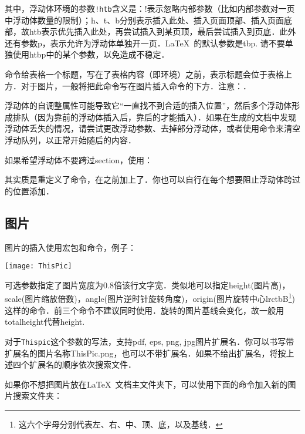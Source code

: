 其中，浮动体环境的参数\verb|!htb|含义是：!表示忽略内部参数（比如内部参数对一页中浮动体数量的限制）；h、t、b分别表示插入此处、插入页面顶部、插入页面底部，故htb表示优先插入此处，再尝试插入到某页顶，最后尝试插入到页底．此外还有参数p，表示允许为浮动体单独开一页．\LaTeX\ 的默认参数是tbp. 请不要单独使用htbp中的某个参数，以免造成不稳定．

命令给表格一个标题，写在了表格内容（即环境）之前，表示标题会位于表格上方．对于图片，一般将把此命令写在图片插入命令的下方．注意：．\dpar

浮动体的自调整属性可能导致它“一直找不到合适的插入位置”，然后多个浮动体形成排队（因为靠前的浮动体插入后，靠后的才能插入）．如果在生成的文档中发现浮动体丢失的情况，请尝试更改浮动参数、去掉部分浮动体，或者使用命令来清空浮动队列，以正常开始随后的内容．

如果希望浮动体不要跨过section，使用：
\begin{latex}
\usepackage[section]{placeins}
\end{latex}

其实质是重定义了命令，在之前加上了．你也可以自行在每个想要阻止浮动体跨过的位置添加．

\subsection{图片}
图片的插入使用宏包和命令，例子：
\begin{latex}
\begin{center}
    \texttt{[image: ThisPic]}
\end{center}
\end{latex}

可选参数指定了图片宽度为0.8倍该行文字宽．类似地可以指定height(图片高)，scale(图片缩放倍数)，angle(图片逆时针旋转角度)，origin(图片旋转中心lrctbB\footnote{这六个字母分别代表左、右、中、顶、底，以及基线．})这样的命令．前三个命令不建议同时使用．旋转的图片基线会变化，故一般用totalheight代替height. 

对于\texttt{Thispic}这个参数的写法，\xelatex 支持pdf, eps, png, jpg图片扩展名．你可以书写带扩展名的图片名称ThisPic.png，也可以不带扩展名．如果不给出扩展名，将按上述四个扩展名的顺序依次搜索文件．\dpar

如果你不想把图片放在\LaTeX\ 文档主文件夹下，可以使用下面的命令加入新的图片搜索文件夹：
\begin{latex}
\graphicspath{{c:/pics/}{./pic/}}
\end{latex}

